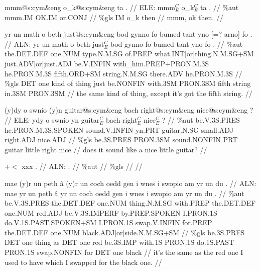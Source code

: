 \documentclass[a4paper,10pt]{article}
\begin{document}
\ex
\begingl[lingstyle=gergl]
\glchat mmm@s:cym\&eng o\_k@s:cym\&eng ta . //
\glsurface ELE:  mmm$^{C}_{E}$ o\_k$^{C}_{E}$ ta .  //
\glauto \%aut  mmm{\scriptsize .IM} OK{\scriptsize .IM} or{\scriptsize .CONJ}   //
\glmanual \%gls  IM o\_k then   //
\gleng mmm, ok then. //
\endgl
\xe

\ex
\begingl[lingstyle=gergl]
\glchat yr un math o beth just@s:cym\&eng bod gynno fo bumed tant yno [=? arno] fo . //
\glsurface ALN:  yr un math o beth just$^{C}_{E}$ bod gynno fo bumed tant yno fo .  //
\glauto \%aut  the{\scriptsize .DET.DEF} one{\scriptsize .NUM} type{\scriptsize .N.M.SG} of{\scriptsize .PREP} what{\scriptsize .INT[or]thing.N.M.SG+SM} just{\scriptsize .ADV[or]just.ADJ} be{\scriptsize .V.INFIN} with\_him{\scriptsize .PREP+PRON.M.3S} he{\scriptsize .PRON.M.3S} fifth{\scriptsize .ORD+SM} string{\scriptsize .N.M.SG} there{\scriptsize .ADV} he{\scriptsize .PRON.M.3S}   //
\glmanual \%gls  DET one kind of thing just be{\scriptsize .NONFIN} with{\scriptsize .3SM} PRON{\scriptsize .3SM} fifth string in{\scriptsize .3SM} PRON{\scriptsize .3SM}   //
\gleng the same kind of thing, except it's got the fifth string. //
\endgl
\xe

\ex
\begingl[lingstyle=gergl]
\glchat (y)dy o swnio (y)n guitar@s:cym\&eng bach right@s:cym\&eng nice@s:cym\&eng ? //
\glsurface ELE:  ydy o swnio yn guitar$^{C}_{E}$ bach right$^{C}_{E}$ nice$^{C}_{E}$ ?  //
\glauto \%aut  be{\scriptsize .V.3S.PRES} he{\scriptsize .PRON.M.3S.SPOKEN} sound{\scriptsize .V.INFIN} yn{\scriptsize .PRT} guitar{\scriptsize .N.SG} small{\scriptsize .ADJ} right{\scriptsize .ADJ} nice{\scriptsize .ADJ}   //
\glmanual \%gls  be{\scriptsize .3S.PRES} PRON{\scriptsize .3SM} sound{\scriptsize .NONFIN} PRT guitar little right nice   //
\gleng does it sound like a nice little guitar? //
\endgl
\xe

\ex
\begingl[lingstyle=gergl]
\glchat +$<$ xxx . //
\glsurface ALN:  .  //
\glauto \%aut    //
\glmanual \%gls    //
\gleng  //
\endgl
\xe

\ex
\begingl[lingstyle=gergl]
\glchat mae (y)r un peth â (y)r un coch oedd gen i wnes i swopio am yr un du . //
\glsurface ALN:  mae yr un peth â yr un coch oedd gen i wnes i swopio am yr un du .  //
\glauto \%aut  be{\scriptsize .V.3S.PRES} the{\scriptsize .DET.DEF} one{\scriptsize .NUM} thing{\scriptsize .N.M.SG} with{\scriptsize .PREP} the{\scriptsize .DET.DEF} one{\scriptsize .NUM} red{\scriptsize .ADJ} be{\scriptsize .V.3S.IMPERF} by{\scriptsize .PREP.SPOKEN} I{\scriptsize .PRON.1S} do{\scriptsize .V.1S.PAST.SPOKEN+SM} I{\scriptsize .PRON.1S} swap{\scriptsize .V.INFIN} for{\scriptsize .PREP} the{\scriptsize .DET.DEF} one{\scriptsize .NUM} black{\scriptsize .ADJ[or]side.N.M.SG+SM}   //
\glmanual \%gls  be{\scriptsize .3S.PRES} DET one thing as DET one red be{\scriptsize .3S.IMP} with{\scriptsize .1S} PRON{\scriptsize .1S} do{\scriptsize .1S.PAST} PRON{\scriptsize .1S} swap{\scriptsize .NONFIN} for DET one black   //
\gleng it's the same as the red one I used to have which I swapped for the black one. //
\endgl
\xe
\end{document}
